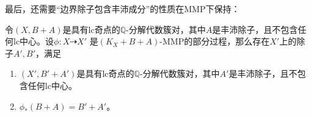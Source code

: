 

最后，还需要``边界除子包含丰沛成分''的性质在MMP下保持：
\begin{lemma}\cite[Lemma 4.3]{tx23}
 令$(X,B+A)$是具有lc奇点的$\mathbb{Q}$-分解代数簇对，其中$A$是丰沛除子，且不包含任何lc中心。设$\phi:X \dashrightarrow X' $ 是$(K_{X}+B+A)$-MMP的部分过程，那么存在$X'$上的除子$A',B'$，满足
 \begin{enumerate}
   \item $(X',B'+A')$是具有lc奇点的$\mathbb{Q}$-分解代数簇对，其中$A'$是丰沛除子，且不包含任何lc中心。
   \item $\phi_{*}(B+A)=B'+A'$。
 \end{enumerate}
\end{lemma}
